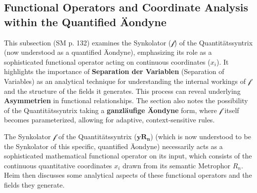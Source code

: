 \documentclass[12pt]{article}
\newcommand{\quantitaetssyntrix}{\bm{yR_n}}
\newcommand{\semantischermetrophor}{R_n}
\newcommand{\funktionaloperator}{\mathcal{f}}
\begin{document}
\subsection{Functional Operators and Coordinate Analysis within the Quantified Äondyne}
\label{sec:functional_operators_aeondyne}

This subsection (SM p. 132) examines the Synkolator (\(\funktionaloperator\)) of the Quantitätssyntrix (now understood as a quantified Äondyne), emphasizing its role as a sophisticated functional operator acting on continuous coordinates (\(x_i\)). It highlights the importance of \textbf{Separation der Variablen} (Separation of Variables) as an analytical technique for understanding the internal workings of \(\funktionaloperator\) and the structure of the fields it generates. This process can reveal underlying \textbf{Asymmetrien} in functional relationships. The section also notes the possibility of the Quantitätssyntrix taking a \textbf{ganzläufige Äondyne} form, where \(\funktionaloperator\) itself becomes parameterized, allowing for adaptive, context-sensitive rules.

The Synkolator \( \funktionaloperator \) of the Quantitätssyntrix (\(\quantitaetssyntrix\)) (which is now understood to be the Synkolator of this specific, quantified Äondyne) necessarily acts as a sophisticated mathematical functional operator on its input, which consists of the continuous quantitative coordinates \( x_i \) drawn from its semantic Metrophor \( \semantischermetrophor \). Heim then discusses some analytical aspects of these functional operators and the fields they generate.
\end{document}
